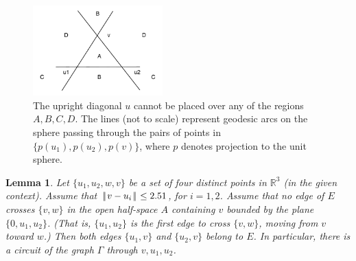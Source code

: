 \documentclass[11pt]{amsart}
\newcommand{\ring}[1]{\mathbb{#1}}
\def\|{{\hskip0.1em|\hskip-0.15em|\hskip0.1em}}
\newtheorem{lemma}{Lemma}
\begin{document}
\begin{figure}
\begin{center}
\includegraphics[width=5cm]{nogo.pdf}
\end{center}
\caption{The upright diagonal $u$ cannot be placed over any of
the regions $A,B,C,D$.  The lines (not to scale) represent geodesic arcs on the
sphere passing through the pairs of points in $\{p(u_1),p(u_2),p(v)\}$,
where $p$ denotes projection to the unit sphere.}
\label{fig:nogo}
\end{figure}

\begin{lemma}\label{lemma:circuit} 
Let $\{u_1,u_2,w,v\}$ be a set of four distinct points
in $\ring{R}^3$ (in the given context).  
Assume that
 $\|v-u_i\|\le 2.51$, for $i=1,2$.
Assume that no edge of $E$ crosses $\{v,w\}$
in the open 
half-space $A$ containing $v$ bounded by the plane $\{0,u_1,u_2\}$.
(That is, $\{u_1,u_2\}$ is the first edge to cross $\{v,w\}$, moving
from $v$ toward $w$.)
Then 
both edges $\{u_1,v\}$ and $\{u_2,v\}$ belong to $E$.
In particular, there is a circuit of the graph $\Gamma$ through $v,u_1,u_2$.
\end{lemma}
\end{document}
